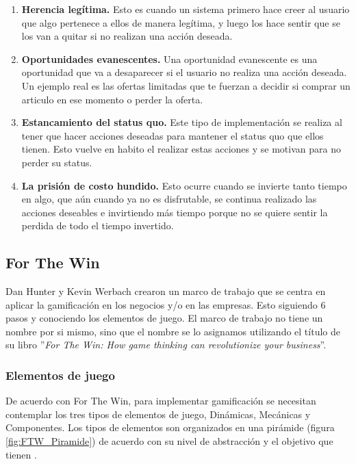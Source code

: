         \begin{enumerate}
            \item \textbf{Herencia legítima.}\cite{libro3} Esto es cuando un sistema primero hace creer al usuario que algo pertenece a ellos de manera legítima, y luego los hace sentir que se los van a quitar si no realizan una acción deseada.
            
            \item \textbf{Oportunidades evanescentes.}\cite{libro3} Una oportunidad evanescente es una oportunidad que va a desaparecer si el usuario no realiza una acción deseada. Un ejemplo real es las ofertas limitadas que te fuerzan a decidir si comprar un articulo en ese momento o perder la oferta.
            
            \item \textbf{Estancamiento del status quo.}\cite{libro3} Este tipo de implementación se realiza al tener que hacer acciones deseadas para mantener el status quo que ellos tienen. Esto vuelve en habito el realizar estas acciones y se motivan para no perder su status.
            
            \item \textbf{La prisión de costo hundido.}\cite{libro3} Esto ocurre cuando se invierte tanto tiempo en algo, que aún cuando ya no es disfrutable, se continua realizado las acciones deseables e invirtiendo más tiempo porque no se quiere sentir la perdida de todo el tiempo invertido.
            
        \end{enumerate}
    

\clearpage
\subsection{For The Win}
\label{sec:ForTheWin}
    Dan Hunter y Kevin Werbach crearon un marco de trabajo que se centra en aplicar la gamificación en los negocios y/o en las empresas. Esto siguiendo 6 pasos y conociendo los elementos de juego. El marco de trabajo no tiene un nombre por si mismo, sino que el nombre se lo asignamos utilizando el título de su libro ''\textit{For The Win:  How game thinking can revolutionize your business}''.
    
\subsubsection{Elementos de juego}
    
    \noindent De acuerdo con For The Win, para implementar gamificación se necesitan contemplar los tres tipos de elementos de juego, Dinámicas, Mecánicas y Componentes. Los tipos de elementos son organizados en una pirámide (figura 
    \ref{fig:FTW_Piramide}) de acuerdo con su nivel de abstracción 
    y el objetivo que tienen \cite[pp. 55-57]{FrameWorkForTheWin}.
    
